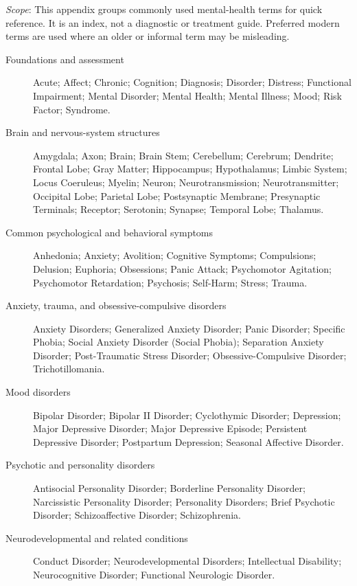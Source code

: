 \small
\noindent\textit{Scope}: This appendix groups commonly used mental-health terms for quick reference. It is an index, not a diagnostic or treatment guide. Preferred modern terms are used where an older or informal term may be misleading.

\medskip
\begin{description}
\item[Foundations and assessment] Acute; Affect; Chronic; Cognition; Diagnosis; Disorder; Distress; Functional Impairment; Mental Disorder; Mental Health; Mental Illness; Mood; Risk Factor; Syndrome.

\item[Brain and nervous-system structures] Amygdala; Axon; Brain; Brain Stem; Cerebellum; Cerebrum; Dendrite; Frontal Lobe; Gray Matter; Hippocampus; Hypothalamus; Limbic System; Locus Coeruleus; Myelin; Neuron; Neurotransmission; Neurotransmitter; Occipital Lobe; Parietal Lobe; Postsynaptic Membrane; Presynaptic Terminals; Receptor; Serotonin; Synapse; Temporal Lobe; Thalamus.

\item[Common psychological and behavioral symptoms] Anhedonia; Anxiety; Avolition; Cognitive Symptoms; Compulsions; Delusion; Euphoria; Obsessions; Panic Attack; Psychomotor Agitation; Psychomotor Retardation; Psychosis; Self-Harm; Stress; Trauma.

\item[Anxiety, trauma, and obsessive-compulsive disorders] Anxiety Disorders; Generalized Anxiety Disorder; Panic Disorder; Specific Phobia; Social Anxiety Disorder (Social Phobia); Separation Anxiety Disorder; Post-Traumatic Stress Disorder; Obsessive-Compulsive Disorder; Trichotillomania.

\item[Mood disorders] Bipolar Disorder; Bipolar II Disorder; Cyclothymic Disorder; Depression; Major Depressive Disorder; Major Depressive Episode; Persistent Depressive Disorder; Postpartum Depression; Seasonal Affective Disorder.

\item[Psychotic and personality disorders] Antisocial Personality Disorder; Borderline Personality Disorder; Narcissistic Personality Disorder; Personality Disorders; Brief Psychotic Disorder; Schizoaffective Disorder; Schizophrenia.

\item[Neurodevelopmental and related conditions] Conduct Disorder; Neurodevelopmental Disorders; Intellectual Disability; Neurocognitive Disorder; Functional Neurologic Disorder.


\end{description}
